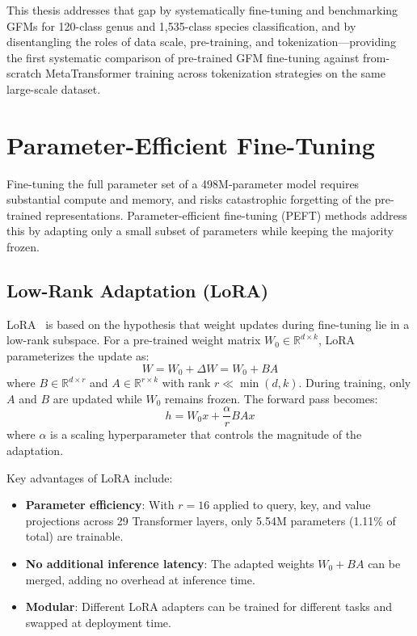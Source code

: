 This thesis addresses that gap by systematically fine-tuning and benchmarking GFMs for 120-class genus and 1,535-class species classification, and by disentangling the roles of data scale, pre-training, and tokenization---providing the first systematic comparison of pre-trained GFM fine-tuning against from-scratch MetaTransformer training across tokenization strategies on the same large-scale dataset.

\section{Parameter-Efficient Fine-Tuning}
\label{sec:bg-peft}

Fine-tuning the full parameter set of a 498M-parameter model requires substantial compute and memory, and risks catastrophic forgetting of the pre-trained representations. Parameter-efficient fine-tuning (PEFT) methods address this by adapting only a small subset of parameters while keeping the majority frozen.

\subsection{Low-Rank Adaptation (LoRA)}

LoRA~\cite{Hu2022} is based on the hypothesis that weight updates during fine-tuning lie in a low-rank subspace. For a pre-trained weight matrix $W_0 \in \mathbb{R}^{d \times k}$, LoRA parameterizes the update as:
\begin{equation}
    W = W_0 + \Delta W = W_0 + BA
    \label{eq:lora}
\end{equation}
where $B \in \mathbb{R}^{d \times r}$ and $A \in \mathbb{R}^{r \times k}$ with rank $r \ll \min(d, k)$. During training, only $A$ and $B$ are updated while $W_0$ remains frozen. The forward pass becomes:
\begin{equation}
    h = W_0 x + \frac{\alpha}{r} B A x
\end{equation}
where $\alpha$ is a scaling hyperparameter that controls the magnitude of the adaptation.

Key advantages of LoRA include:
\begin{itemize}
    \item \textbf{Parameter efficiency}: With $r=16$ applied to query, key, and value projections across 29 Transformer layers, only 5.54M parameters (1.11\% of total) are trainable.
    \item \textbf{No additional inference latency}: The adapted weights $W_0 + BA$ can be merged, adding no overhead at inference time.
    \item \textbf{Modular}: Different LoRA adapters can be trained for different tasks and swapped at deployment time.
\end{itemize}


